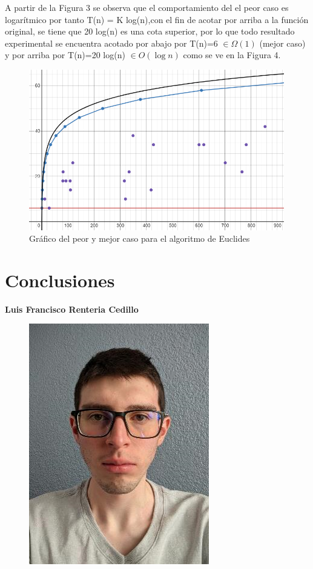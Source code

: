 \documentclass[12pt,twoside]{article}
\begin{document}
A partir de la Figura 3 se observa que el comportamiento del el peor caso es logar\'itmico por tanto T(n) = K log(n),con el fin de acotar por arriba a la funci\'on original, se tiene que 20 log(n) es una cota superior, por lo que todo resultado experimental se encuentra acotado por abajo por T(n)=6 $\in \Omega(1)$  (mejor caso) y por arriba por T(n)=20 log(n) $\in O(\log{}n)$ como se ve en la Figura 4.
\begin{figure}[H]
    \centering
    \includegraphics[height=7cm]{imagenes/grafica322.png}
    \caption{Gráfico del peor y mejor caso para el algoritmo de Euclides}
\end{figure}

\newpage 

\section{Conclusiones}
\textbf{\large Luis Francisco Renteria Cedillo}
\begin{figure}[H]
    \centering
    \includegraphics[angle=0, scale=0.5]{imagenes/foto1.png}
\end{figure}
\end{document}
